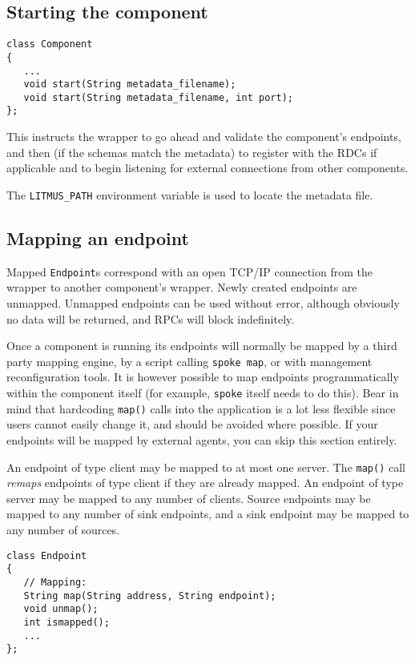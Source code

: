 \documentclass[12pt,a4paper,twoside]{article}
\renewcommand{\_}{\texttt{\symbol{95}}}
\begin{document}
\subsection{Starting the component}

\begin{verbatim}
class Component
{
   ...
   void start(String metadata_filename);
   void start(String metadata_filename, int port);
};
\end{verbatim}

This instructs the wrapper to go ahead and validate the component's
endpoints, and then (if the schemas match the metadata) to register
with the RDCs if applicable and to begin listening for external
connections from other components.

The \verb^LITMUS_PATH^ environment variable is used to locate the
metadata file.

\subsection{Mapping an endpoint}

Mapped \verb^Endpoint^s correspond with an open TCP/IP connection
from the wrapper to another component's wrapper.
Newly created endpoints are unmapped.
Unmapped endpoints can be used without error, although
obviously no data will be returned, and RPCs will
block indefinitely.

Once a component is running its endpoints will normally be
mapped by a third party mapping engine, by a script calling
\verb^spoke map^, or with management reconfiguration tools.
It is however possible to map endpoints programmatically within
the component itself (for example, \verb^spoke^ itself needs
to do this). Bear in mind that hardcoding
\verb^map()^ calls into the application is a lot less flexible
since users cannot easily change it,
and should be avoided where possible. If your endpoints will
be mapped by external agents, you can skip this section entirely.

An endpoint of type client may be mapped to at most one server.
The \verb^map()^ call \textit{remaps} endpoints of type client
if they are already mapped.
An endpoint of type server may be mapped
to any number of clients. Source endpoints may be mapped to any number
of sink endpoints, and a sink endpoint may be mapped to any number of
sources.

\begin{verbatim}
class Endpoint
{
   // Mapping: 
   String map(String address, String endpoint);
   void unmap();
   int ismapped();
   ...
};
\end{verbatim}
\end{document}
